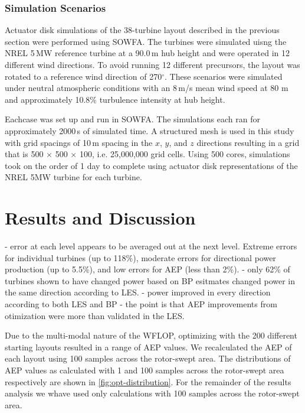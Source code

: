 \documentclass[conf]{new-aiaa}
\begin{document}
\subsubsection{Simulation Scenarios}

Actuator disk simulations of the 38-turbine layout described in the previous section were performed using SOWFA.  The turbines were simulated uisng the NREL 5\,MW reference turbine \cite{jonkman2009definition} at a 90.0\,m hub height and were operated in 12 different wind directions. To avoid running 12 different precursors, the layout was rotated to a reference wind direction of 270$^\circ$.  These scenarios were simulated under neutral atmospheric conditions with an 8\,m/s mean wind speed at 80 m and approximately 10.8$\%$ turbulence intensity at hub height.

Eachcase was set up and run in SOWFA.  The simulations each ran for approximately 2000\,s of simulated time.  A structured mesh is used in this study with grid spacings of 10\,m spacing in the $x$, $y$, and $z$ directions resulting in a grid that is 500 $\times$ 500 $\times$ 100, i.e. 25,000,000 grid cells.  Using 500 cores, simulations took on the order of 1 day to complete using actuator disk representations of the NREL 5MW turbine for each turbine.  




\section{Results and Discussion}


- error at each level appears to be averaged out at the next level. Extreme errors for individual turbines (up to 118\%), moderate errors for directional power production (up to 5.5\%), and low errors for AEP (less than 2\%).
- only 62\% of turbines shown to have changed power based on BP esitmates changed power in the same direction according to LES.
- power improved in every direction according to both LES and BP
- the point is that AEP improvements from otimization were more than validated in the LES.

Due to the multi-modal nature of the WFLOP, optimizing with the 200 different starting layouts resulted in a range of AEP values. We recalculated the AEP of each layout using 100 samples across the rotor-swept area. The distributions of AEP values as calculated with 1 and 100 samples across the rotor-swept area respectively are shown in \cref{fig:opt-distribution}. For the remainder of the results analysis we whave used only calculations with 100 samples across the rotor-swept area.
\end{document}

